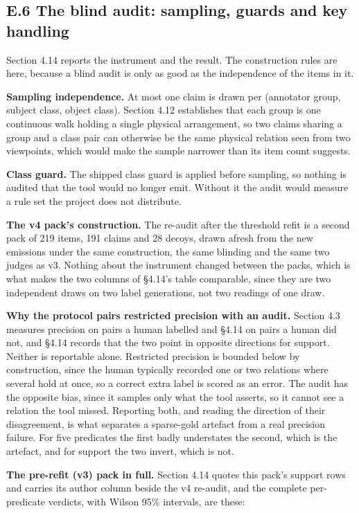 \subsection{E.6 The blind audit: sampling, guards and key handling}

Section 4.14 reports the instrument and the result. The construction rules are here, because a blind audit is only as good as the independence of the items in it.

\textbf{Sampling independence.} At most one claim is drawn per (annotator group, subject class, object class). Section 4.12 establishes that each group is one continuous walk holding a single physical arrangement, so two claims sharing a group and a class pair can otherwise be the same physical relation seen from two viewpoints, which would make the sample narrower than its item count suggests.

\textbf{Class guard.} The shipped class guard is applied before sampling, so nothing is audited that the tool would no longer emit. Without it the audit would measure a rule set the project does not distribute.

\textbf{The v4 pack's construction.} The re-audit after the threshold refit is a second pack of 219 items, 191 claims and 28 decoys, drawn afresh from the new emissions under the same construction, the same blinding and the same two judges as v3. Nothing about the instrument changed between the packs, which is what makes the two columns of \S{}4.14's table comparable, since they are two independent draws on two label generations, not two readings of one draw.

\textbf{Why the protocol pairs restricted precision with an audit.} Section 4.3 measures precision on pairs a human labelled and \S{}4.14 on pairs a human did not, and \S{}4.14 records that the two point in opposite directions for support. Neither is reportable alone. Restricted precision is bounded below by construction, since the human typically recorded one or two relations where several hold at once, so a correct extra label is scored as an error. The audit has the opposite bias, since it samples only what the tool asserts, so it cannot see a relation the tool missed. Reporting both, and reading the direction of their disagreement, is what separates a sparse-gold artefact from a real precision failure. For five predicates the first badly understates the second, which is the artefact, and for support the two invert, which is not.

\textbf{The pre-refit (v3) pack in full.} Section 4.14 quotes this pack's support rows and carries its author column beside the v4 re-audit, and the complete per-predicate verdicts, with Wilson 95\% intervals, are these:

